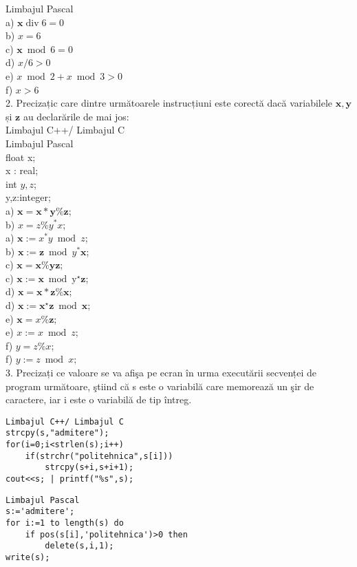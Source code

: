 Limbajul Pascal\\
a) $\mathbf{x} \operatorname{div} 6=0$\\
b) $x=6$\\
c) $\mathbf{x} \bmod 6=0$\\
d) $x / 6>0$\\
e) $x \bmod 2+x \bmod 3>0$\\
f) $x>6$\\
2. Precizațic care dintre următoarele instrucțiuni este corectă dacă variabilele $\mathbf{x}, \mathbf{y}$ și $\mathbf{z}$ au declarările de mai jos:\\
Limbajul C++/ Limbajul C\\
Limbajul Pascal\\
float x;\\
x : real;\\
int $y, z$;\\
y,z:integer;\\
a) $\mathbf{x}=\mathbf{x} * \mathbf{y} \% \mathbf{z}$;\\
b) $x=z \% y^{*} x$;\\
a) $\mathbf{x}:=x^{*} y \bmod z$;\\
b) $\mathbf{x}:=\mathbf{z} \bmod y^{*} \mathbf{x}$;\\
c) $\mathbf{x}=\mathbf{x} \% \mathbf{y} \mathbf{z}$;\\
c) $\mathbf{x}:=\mathbf{x} \bmod \mathrm{y}^{\star} \mathbf{z}$;\\
d) $\mathbf{x}=\mathbf{x *} \mathbf{z} \% \mathbf{x}$;\\
d) $\mathbf{x}:=\mathbf{x}^{\star} \mathbf{z} \bmod \mathbf{x}$;\\
e) $\mathbf{x}=x \% \mathbf{z}$;\\
e) $x:=x \bmod z$;\\
f) $y=z \% x$;\\
f) $y:=z \bmod x ;$\\
3. Precizați ce valoare se va afişa pe ecran în urma executării secvenței de program următoare, ştiind că s este o variabilă care memorează un şir de caractere, iar i este o variabilă de tip întreg.

\begin{verbatim}
Limbajul C++/ Limbajul C
strcpy(s,"admitere");
for(i=0;i<strlen(s);i++)
    if(strchr("politehnica",s[i]))
        strcpy(s+i,s+i+1);
cout<<s; | printf("%s",s);
\end{verbatim}

\begin{verbatim}
Limbajul Pascal
s:='admitere';
for i:=1 to length(s) do
    if pos(s[i],'politehnica')>0 then
        delete(s,i,1);
write(s);
\end{verbatim}

